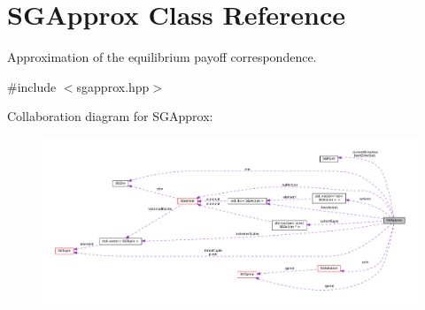 \hypertarget{classSGApprox}{}\section{S\+G\+Approx Class Reference}
\label{classSGApprox}


Approximation of the equilibrium payoff correspondence.  




{\ttfamily \#include $<$sgapprox.\+hpp$>$}



Collaboration diagram for S\+G\+Approx\+:
\nopagebreak
\begin{figure}[H]
\begin{center}
\leavevmode
\includegraphics[width=350pt]{classSGApprox__coll__graph}
\end{center}
\end{figure}
